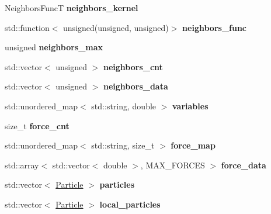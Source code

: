 \begin{DoxyCompactItemize}
Neighbors\+FuncT {\bfseries neighbors\+\_\+kernel}
\item 
\mbox{\label{namespacewash_a30e3126cfc2ad16d213276aae000265a}} 
std\+::function$<$ unsigned(unsigned, unsigned)$>$ {\bfseries neighbors\+\_\+func}
\item 
\mbox{\label{namespacewash_a0f37c0d27c6c9494a3955d553b540690}} 
unsigned {\bfseries neighbors\+\_\+max}
\item 
\mbox{\label{namespacewash_a32772cb14a972d767ad1389cd98c5dbc}} 
std\+::vector$<$ unsigned $>$ {\bfseries neighbors\+\_\+cnt}
\item 
\mbox{\label{namespacewash_a5d5845915575f101cad2c7f2a2ecb377}} 
std\+::vector$<$ unsigned $>$ {\bfseries neighbors\+\_\+data}
\item 
\mbox{\label{namespacewash_a820e90a9045d0f0df213eed09939e1ca}} 
std\+::unordered\+\_\+map$<$ std\+::string, double $>$ {\bfseries variables}
\item 
\mbox{\label{namespacewash_a789543df6661367f3f1c74564b651bc1}} 
size\+\_\+t {\bfseries force\+\_\+cnt}
\item 
\mbox{\label{namespacewash_a77bf373c7f48aed54e36e089a47a74ab}} 
std\+::unordered\+\_\+map$<$ std\+::string, size\+\_\+t $>$ {\bfseries force\+\_\+map}
\item 
\mbox{\label{namespacewash_a28483034a1e07f656173e973ac88e82b}} 
std\+::array$<$ std\+::vector$<$ double $>$, M\+A\+X\+\_\+\+F\+O\+R\+C\+ES $>$ {\bfseries force\+\_\+data}
\item 
\mbox{\label{namespacewash_aa7c72cd2ae1de516f31beb4bc63f31ef}} 
std\+::vector$<$ \mbox{\hyperlink{classwash_1_1Particle}{Particle}} $>$ {\bfseries particles}
\item 
\mbox{\label{namespacewash_acb289595df7b8e6626daeeb132e1c445}} 
std\+::vector$<$ \mbox{\hyperlink{classwash_1_1Particle}{Particle}} $>$ {\bfseries local\+\_\+particles}
\item 
\mbox{\label{namespacewash_a6ec4f15aa36a1ef9fe7ea1a5ddf4480f}} 

\end{DoxyCompactItemize}
